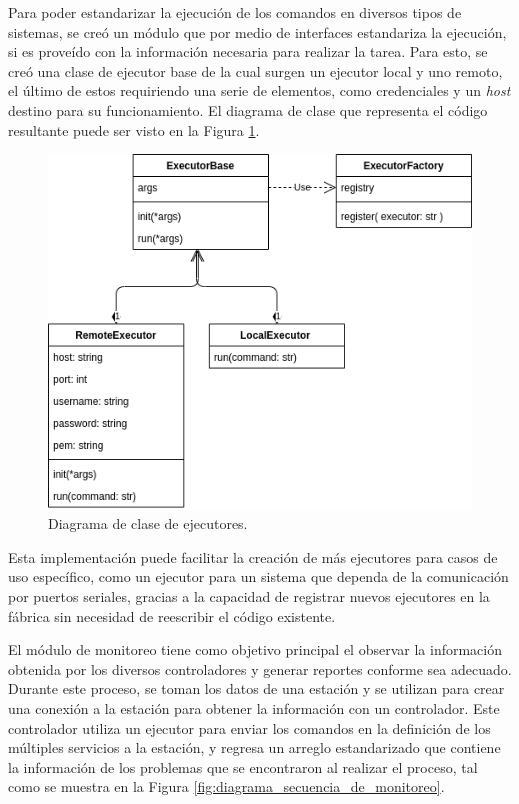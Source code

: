 Para poder estandarizar la ejecución de los comandos en diversos tipos de sistemas, se creó un módulo que por medio de interfaces estandariza la ejecución, si es proveído con la información necesaria para realizar la tarea. Para esto, se creó una clase de ejecutor base de la cual surgen un ejecutor local y uno remoto, el último de estos requiriendo una serie de elementos, como credenciales y un \textit{host} destino para su funcionamiento. El diagrama de clase que representa el código resultante puede ser visto en la Figura \ref*{fig:diagrama_clase_ejecutores}.

\begin{figure}[!ht]
	\centering
	\includegraphics[width=0.7\linewidth]{images/diagrams/classes/executors.drawio.png}
	\caption{Diagrama de clase de ejecutores.}
	\label{fig:diagrama_clase_ejecutores}
\end{figure}

Esta implementación puede facilitar la creación de más ejecutores para casos de uso específico, como un ejecutor para un sistema que dependa de la comunicación por puertos seriales, gracias a la capacidad de registrar nuevos ejecutores en la fábrica sin necesidad de reescribir el código existente.

El módulo de monitoreo tiene como objetivo principal el observar la información obtenida por los diversos controladores y generar reportes conforme sea adecuado. Durante este proceso, se toman los datos de una estación y se utilizan para crear una conexión a la estación para obtener la información con un controlador. Este controlador utiliza un ejecutor para enviar los comandos en la definición de los múltiples servicios a la estación, y regresa un arreglo estandarizado que contiene la información de los problemas que se encontraron al realizar el proceso, tal como se muestra en la Figura \ref{fig:diagrama_secuencia_de_monitoreo}.

